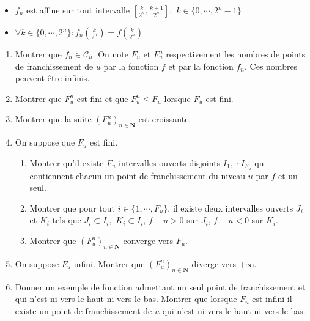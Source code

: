\begin{itemize}
\item  $f_{n}$ est affine sur tout intervalle $[ \frac{k}{2^{n}},\frac{k+1}{2^{n}}] ,$ $k\in \{ 0,\cdots ,2^{n}-1\} $

\item  $\forall k\in \{ 0,\cdots ,2^{n}\} :f_{n}(\frac{k}{2^{n}} )=f(\frac{k}{2^{n}})$
\end{itemize}

\begin{enumerate}
\item  Montrer que $f_{n}\in \mathcal{C}_{u}$. On note $F_{u}$ et $F_{u}^{n}$ respectivement les nombres de points de franchissement de $u$ par la
fonction $f$ et par la fonction $f_{n}$. Ces nombres peuvent {\^e}tre infinis.

\item  Montrer que $F_{u}^{n}$ est fini et que $F_{u}^{n}\leq F_{u}$ lorsque $F_{u}$ est fini.

\item  Montrer que la suite $(F_{u}^{n})_{n\in \mathbf{N}}$ est croissante.

\item  On suppose que $F_{u}$ est fini.

\begin{enumerate}
\item  Montrer qu'il existe $F_{u}$ intervalles ouverts disjoints $I_{1},\cdots I_{F_{u}}$ qui contiennent chacun un point de franchissement du
niveau $u$ par $f$ et un seul.

\item  Montrer que pour tout $i\in \{ 1,\cdots ,F_{u}\} $, il existe deux intervalles ouverts $J_{i}$ et $K_{i}$ tels que
$J_{i}\subset I_{i},$ $K_{i}\subset I_{i}$, $f-u>0$ sur $J_{i}$, $f-u<0$ sur $K_{i}$.

\item  Montrer que $(F_{u}^{n})_{n\in \mathbf{N}}$ converge vers $F_{u}$.
\end{enumerate}

\item  On suppose $F_{u}$ infini. Montrer que $(F_{u}^{n})_{n\in \mathbf{N}}$ diverge vers $+\infty $.

\item Donner un exemple de fonction admettant un seul point de franchissement et qui n'est ni vers le haut ni vers le bas.\newline
 Montrer que lorsque $F_{u}$ est infini il existe un point de franchissement de $u$ qui n'est ni vers le haut ni vers le bas.
\end{enumerate}
